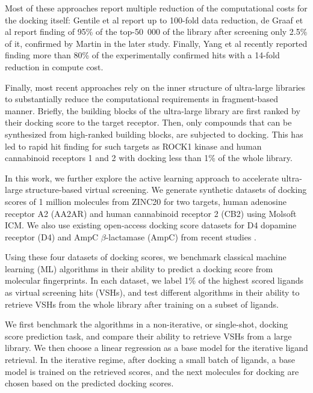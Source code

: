 Most of these approaches report multiple reduction of the computational costs for the docking itself: Gentile et al report up to 100-fold data reduction, de Graaf et al report finding of 95\% of the top-50\ 000 of the library after screening only 2.5\% of it, confirmed by Martin \cite{logistic_regression} in the later study. Finally, Yang et al \cite{Yang2021_shoichet_active_learning} recently reported finding more than 80\% of the experimentally confirmed hits with a 14-fold reduction in compute cost.

Finally, most recent approaches \cite{Sadybekov2021_vsynthes,beroza_chemical_2022} rely on the inner structure of ultra-large libraries to substantially reduce the computational requirements in fragment-based manner. Briefly, the building blocks of the ultra-large library are first ranked by their docking score to the target receptor. Then, only compounds that can be synthesized from high-ranked building blocks, are subjected to docking. This has led to rapid hit finding for such targets as ROCK1 kinase and human cannabinoid receptors 1 and 2 with docking less than 1\% of the whole library.

In this work, we further explore the active learning approach to accelerate ultra-large structure-based virtual screening. We generate synthetic datasets of docking scores of 1 million molecules from ZINC20 \cite{Irwin2020ZINC20Discovery} for two targets, human adenosine receptor A2 (AA2AR) and human cannabinoid receptor 2 (CB2) using Molsoft ICM. We also use existing open-access docking score datasets for D4 dopamine receptor (D4) and AmpC $\beta$-lactamase (AmpC) from recent studies \cite{ultralarge_docking_first}. 

Using these four datasets of docking scores, we benchmark classical machine learning (ML) algorithms in their ability to predict a docking score from molecular fingerprints. In each dataset, we label 1\% of the highest scored ligands as virtual screening hits (VSHs), and test different algorithms in their ability to retrieve VSHs from the whole library after training on a subset of ligands.

We first benchmark the algorithms in a non-iterative, or single-shot, docking score prediction task, and compare their ability to retrieve VSHs from a large library. We then choose a linear regression as a base model for the iterative ligand retrieval. In the iterative regime, after docking a small batch of ligands, a base model is trained on the retrieved scores, and the next molecules for docking are chosen based on the predicted docking scores.


